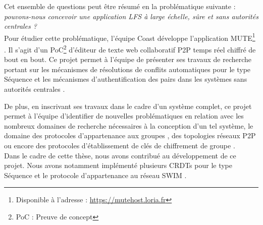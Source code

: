 Cet ensemble de questions peut être résumé en la problématique suivante : \emph{pouvons-nous concevoir une application \ac{LFS} à large échelle, sûre et sans autorités centrales ?}\\

Pour étudier cette problématique, l'équipe Coast développe l'application \acf{MUTE}\footnote{Disponible à l'adresse : \url{https://mutehost.loria.fr}} \cite{MUTE2017}.
Il s'agit d'un \acf{PoC}\footnote{\acf{PoC} : Preuve de concept} d'éditeur de texte web collaboratif \ac{P2P} temps réel chiffré de bout en bout.
Ce projet permet à l'équipe de présenter ses travaux de recherche portant sur les mécanismes de résolutions de conflits automatiques pour le type Séquence \cite{2013-logootsplit,2021-these-vic,2022-rls-tpds-nicolas} et les mécanismes d'authentification des pairs dans les systèmes sans autorités centrales \cite{2018-trusternity-short,2018-trusternity-long}.

De plus, en inscrivant ses travaux dans le cadre d'un système complet, ce projet permet à l'équipe d'identifier de nouvelles problématiques en relation avec les nombreux domaines de recherche nécessaires à la conception d'un tel système, \eg le domaine des protocoles d'appartenance aux groupes \cite{swim2002, lifeguard2018}, des topologies réseaux \ac{P2P} \cite{2018-spray-nedelec} ou encore des protocoles d'établissement de clés de chiffrement de groupe \cite{1995-burmester-desmedt}.\\

Dans le cadre de cette thèse, nous avons contribué au développement de ce projet.
Nous avons notamment implémenté plusieurs \acp{CRDT} pour le type Séquence \cite{2013-logootsplit,2022-rls-tpds-nicolas} et le protocole d'appartenance au réseau SWIM \cite{swim2002}.
